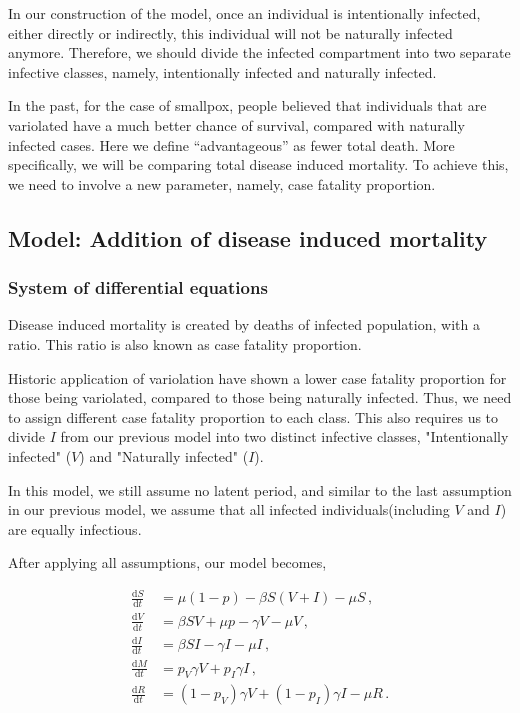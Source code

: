 \documentclass[12pt]{article}
\newcommand\dbyd[2]{\frac{\mathrm d{#1}}{\mathrm d{#2}}}
\newcommand{\pmV}{p_{V}}
\newcommand{\pmI}{p_{I}}
\begin{document}
In our construction of the model, once an individual is intentionally infected, either directly or indirectly, this individual will not be naturally infected anymore. Therefore, we should divide the infected compartment into two separate infective classes, namely, intentionally infected and naturally infected.

In the past, for the case of smallpox, people believed that individuals that are variolated have a much better chance of survival, compared with naturally infected cases. Here we define ``advantageous'' as fewer total death. More specifically, we will be comparing total disease induced mortality. To achieve this, we need to involve a new parameter, namely, case fatality proportion.

\subsection{Model: Addition of disease induced mortality}\label{Newborn section}
\subsubsection{System of differential equations}
Disease induced mortality is created by deaths of infected population, with a ratio. This ratio is also known as case fatality proportion. 

Historic application of variolation have shown a lower case fatality proportion for those being variolated, compared to those being naturally infected. Thus, we need to assign different case fatality proportion to each class. This also requires us to divide $I$ from our previous model into two distinct infective classes, "Intentionally infected" ($V$) and "Naturally infected" ($I$). 

In this model, we still assume no latent period, and similar to the last assumption in our previous model, we assume that all infected individuals(including $V$ and $I$) are equally infectious.

After applying all assumptions, our model becomes,
\begin{linenomath*}
\begin{equation}\label{2}
\begin{split}
\dbyd{S}{t}&=\mu(1-p)- \beta S(V+I)-\mu S \,,\\
\dbyd{V}{t}&=\beta SV+\mu p-\gamma V -\mu V\,,\\
\dbyd{I}{t}&=\beta SI-\gamma I -\mu I\,,\\
\dbyd{M}{t}&=\pmV\gamma V+\pmI\gamma I\,,\\
\dbyd{R}{t}&=(1-\pmV)\gamma V+(1-\pmI)\gamma I-\mu R\,.
\end{split}
\end{equation}
\end{linenomath*}
\end{document}
